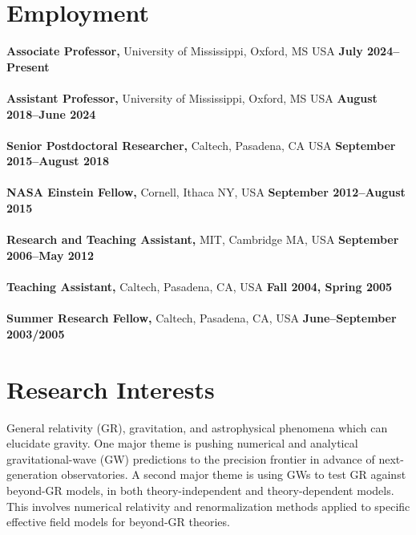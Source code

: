 \documentclass[margin,line]{res}
\begin{document}
\begin{resume}
  \section{\sc Employment}
   {\bf Associate Professor,} University of Mississippi, Oxford, MS USA
  \hfill {\bf July 2024--Present}\\
  \\
  {\bf Assistant Professor,} University of Mississippi, Oxford, MS USA
  \hfill {\bf August 2018--June 2024}\\
  \\
  {\bf Senior Postdoctoral Researcher,} Caltech, Pasadena, CA USA
  \hfill {\bf September 2015--August 2018}\\
  \\
  {\bf NASA Einstein Fellow,} Cornell, Ithaca NY, USA
  \hfill {\bf September 2012--August 2015}\\
  \\
  {\bf Research and Teaching Assistant,} MIT, Cambridge MA, USA \hfill {\bf September 2006--May 2012}\\
  \\
  {\bf Teaching Assistant,} Caltech, Pasadena, CA, USA \hfill {\bf  Fall 2004, Spring 2005}\\
  \\
  {\bf Summer Research Fellow,} Caltech, Pasadena, CA, USA \hfill {\bf  June--September 2003/2005}\\

  \vspace{-1em}

  \section{\sc Research Interests}
  General relativity (GR), gravitation, and astrophysical phenomena which can
  elucidate gravity.
  One major theme is pushing numerical and analytical gravitational-wave
  (GW) predictions to the precision frontier in advance of
  next-generation observatories.
  A second major theme is using GWs to test GR against beyond-GR
  models, in both theory-independent and theory-dependent models.
  This involves numerical relativity and renormalization methods
  applied to specific effective field models for beyond-GR theories.


\end{resume}
\end{document}
